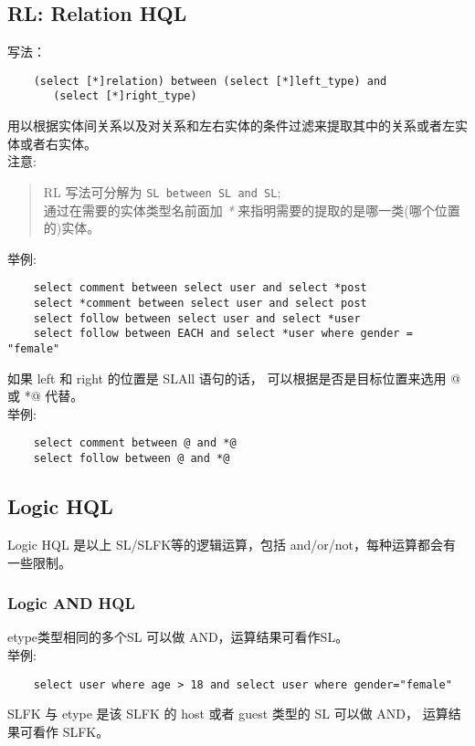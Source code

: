 \documentclass[10pt,a4paper]{article}
\begin{document}
\begin{CJK}{UTF8}{gbsn}
  \subsection{RL: Relation HQL}
  写法：
\begin{verbatim}
    (select [*]relation) between (select [*]left_type) and
       (select [*]right_type)
\end{verbatim}
  用以根据实体间关系以及对关系和左右实体的条件过滤来提取其中的关系或者左实体或者右实体。\\

  注意:
  \begin{quote}
    RL 写法可分解为 \texttt{SL between SL and SL};\\
    通过在需要的实体类型名前面加 \emph{*} 来指明需要的提取的是哪一类(哪个位置的)实体。
  \end{quote}

  举例:
\begin{verbatim}
    select comment between select user and select *post
    select *comment between select user and select post
    select follow between select user and select *user
    select follow between EACH and select *user where gender = "female"
\end{verbatim}

  如果 left 和 right 的位置是 SLAll 语句的话， 可以根据是否是目标位置来选用 @ 或 *@ 代替。\\

  举例:
\begin{verbatim}
    select comment between @ and *@
    select follow between @ and *@
\end{verbatim}

  \subsection{Logic HQL}
  Logic HQL 是以上 SL/SLFK等的逻辑运算，包括 and/or/not，每种运算都会有一些限制。

  \subsubsection{Logic AND HQL}
  etype类型相同的多个SL 可以做 AND，运算结果可看作SL。\\

  举例:
\begin{verbatim}
    select user where age > 18 and select user where gender="female"
\end{verbatim}
  SLFK 与 etype 是该 SLFK 的 host 或者 guest 类型的 SL 可以做 AND， 运算结果可看作 SLFK。\\


\end{CJK}
\end{document}
